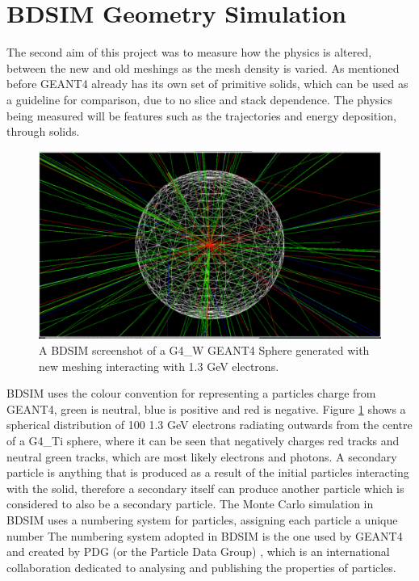 \documentclass[12pt,a4paper]{article}
\begin{document}

\section{BDSIM Geometry Simulation}
\label{int}
The second aim of this project was to measure how the physics is altered, between the new and old meshings as the mesh density is varied. As mentioned before GEANT4 already has its own set of primitive solids, which can be used as a guideline for comparison, due to no slice and stack dependence. The physics being measured will be features such as the trajectories and energy deposition, through solids.

\begin{figure}[h!]
\centering
\includegraphics[scale=0.33]{Images//BDSIM//titanium.pdf}
\caption[width=\columnwidth]{A BDSIM screenshot of a G4\_W GEANT4 Sphere generated with new meshing interacting with 1.3 GeV electrons.}
\label{black}
\end{figure}

\noindent BDSIM uses the colour convention for representing a particles charge from GEANT4, green is neutral, blue is positive and red is negative. Figure \ref{black} shows a spherical distribution of 100 1.3 GeV electrons radiating outwards from the centre of a G4\_Ti sphere, where it can be seen that negatively charges red tracks and neutral green tracks, which are most likely electrons and photons. A secondary particle is anything that is produced as a result of the initial particles interacting with the solid, therefore a secondary itself can produce another particle which is considered to also be  a secondary particle. The Monte Carlo simulation in BDSIM uses a numbering system for 
particles, assigning each particle a unique number The numbering system adopted in BDSIM is the one used by GEANT4 and created by PDG (or the Particle Data Group) \cite{pdg}, which is an international collaboration dedicated to analysing and publishing the properties of particles. 
\end{document}
